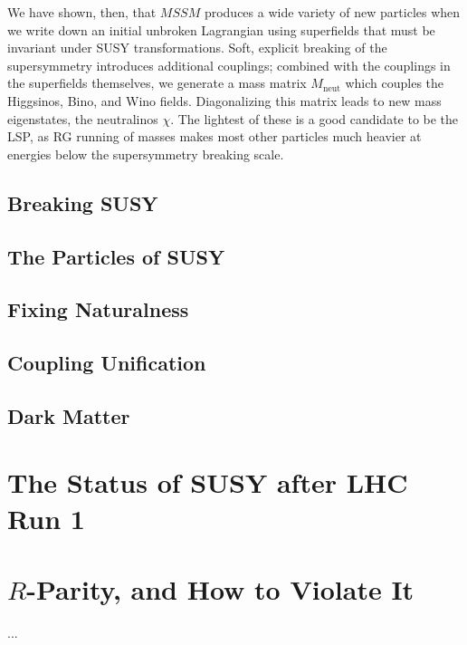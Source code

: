 We have shown, then, that $MSSM$ produces a wide variety of new particles when we write down an initial unbroken Lagrangian using superfields that must be invariant under SUSY transformations. Soft, explicit breaking of the supersymmetry introduces additional couplings; combined with the couplings in the superfields themselves, we generate a mass matrix $M_\mathrm{neut}$ which couples the Higgsinos, Bino, and Wino fields. Diagonalizing this matrix leads to new mass eigenstates, the neutralinos $\chi$. The lightest of these is a good candidate to be the LSP, as RG running of masses makes most other particles much heavier at energies below the supersymmetry breaking scale.

\subsection{Breaking SUSY}

\subsection{The Particles of SUSY}

\subsection{Fixing Naturalness}

\subsection{Coupling Unification}

\subsection{Dark Matter}

\section{The Status of SUSY after LHC Run 1}
\label{chapter:susy:status}

\section{$R$-Parity, and How to Violate It}
\label{chapter:susy:r}
		 ...